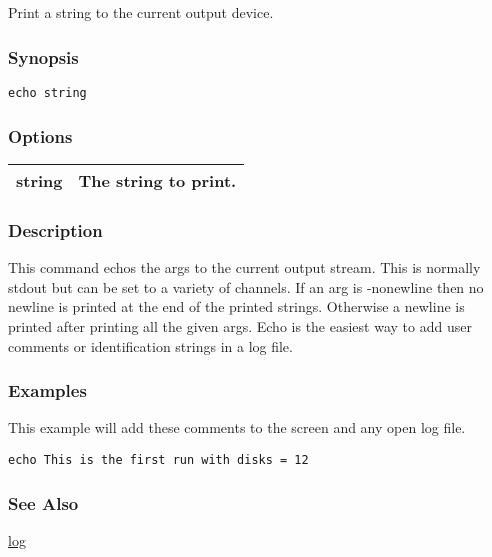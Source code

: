 \subsection{}
\label{echo}
Print a string to the current output device. 
\subsubsection*{Synopsis}
\begin{verbatim}
echo string
\end{verbatim}
\subsubsection*{Options}
\begin{tabular}{|l|l|}
\hline 
 string  & The string to print.  \\
 \hline 
\end{tabular}
\subsubsection*{Description}
 This command echos the args to the current output stream. This is normally stdout but can be set to a variety of channels. If an arg is -nonewline then no newline is printed at the end of the printed strings. Otherwise a newline is printed after printing all the given args. Echo is the easiest way to add user comments or identification strings in a log file. 
\subsubsection*{Examples}
 This example will add these comments to the screen and any open log file. \begin{verbatim}
echo This is the first run with disks = 12
\end{verbatim}
\subsubsection*{See Also}
\hyperref[log]{log} 